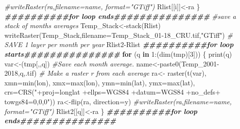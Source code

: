 \documentclass[
  10pt,
  b5paper,
]{book}
\newenvironment{Shaded}{\begin{snugshade}}{\end{snugshade}}
\newcommand{\AttributeTok}[1]{\textcolor[rgb]{0.77,0.63,0.00}{#1}}
\newcommand{\CommentTok}[1]{\textcolor[rgb]{0.56,0.35,0.01}{\textit{#1}}}
\newcommand{\ControlFlowTok}[1]{\textcolor[rgb]{0.13,0.29,0.53}{\textbf{#1}}}
\newcommand{\DecValTok}[1]{\textcolor[rgb]{0.00,0.00,0.81}{#1}}
\newcommand{\DocumentationTok}[1]{\textcolor[rgb]{0.56,0.35,0.01}{\textbf{\textit{#1}}}}
\newcommand{\FunctionTok}[1]{\textcolor[rgb]{0.00,0.00,0.00}{#1}}
\newcommand{\NormalTok}[1]{#1}
\newcommand{\OtherTok}[1]{\textcolor[rgb]{0.56,0.35,0.01}{#1}}
\newcommand{\SpecialCharTok}[1]{\textcolor[rgb]{0.00,0.00,0.00}{#1}}
\newcommand{\StringTok}[1]{\textcolor[rgb]{0.31,0.60,0.02}{#1}}
\begin{document}
\begin{Shaded}
\begin{Highlighting}[]
\CommentTok{\#writeRaster(ra,filename=name, format="GTiff")}
\NormalTok{Rlist[[i]]}\OtherTok{\textless{}{-}}\NormalTok{ra}
\NormalTok{\}}
\DocumentationTok{\#\#\#\#\#\#\#\#\#\#for loop ends\#\#\#\#\#\#\#\#\#\#\#\#\#\#\#}
 \CommentTok{\#save a stack of months averages}
\NormalTok{ Temp\_Stack}\OtherTok{\textless{}{-}}\FunctionTok{stack}\NormalTok{(Rlist)}
\FunctionTok{writeRaster}\NormalTok{(Temp\_Stack,}\AttributeTok{filename=}\StringTok{\textquotesingle{}Temp\_Stack\_01{-}18\_CRU.tif\textquotesingle{}}\NormalTok{,}\StringTok{"GTiff"}\NormalTok{)}
 \CommentTok{\# SAVE 1 layer per month per year}
\NormalTok{ Rlist2}\SpecialCharTok{{-}}\NormalTok{Rlist}
\DocumentationTok{\#\#\#\#\#\#\#\#\#\#for loop starts\#\#\#\#\#\#\#\#\#\#\#\#\#\#\#}
 \ControlFlowTok{for}\NormalTok{ (q }\ControlFlowTok{in} \DecValTok{1}\SpecialCharTok{:}\NormalTok{(}\FunctionTok{dim}\NormalTok{(tmp)[}\DecValTok{3}\NormalTok{])) \{}
\FunctionTok{print}\NormalTok{(q)}
\NormalTok{var}\OtherTok{\textless{}{-}}\NormalTok{(tmp[,,q])}
 \CommentTok{\#Save each month average. }
\NormalTok{ name}\OtherTok{\textless{}{-}}\FunctionTok{paste0}\NormalTok{(}\StringTok{\textquotesingle{}Temp\_2001{-}2018\textquotesingle{}}\NormalTok{,q,}\StringTok{\textquotesingle{}.tif\textquotesingle{}}\NormalTok{)}
 \CommentTok{\# Make a raster r from each average}
\NormalTok{ra}\OtherTok{\textless{}{-}} \FunctionTok{raster}\NormalTok{(}\FunctionTok{t}\NormalTok{(var), }\AttributeTok{xmn=}\FunctionTok{min}\NormalTok{(lon), }\AttributeTok{xmx=}\FunctionTok{max}\NormalTok{(lon), }\AttributeTok{ymn=}\FunctionTok{min}\NormalTok{(lat), }\AttributeTok{ymx=}\FunctionTok{max}\NormalTok{(lat), }\AttributeTok{crs=}\FunctionTok{CRS}\NormalTok{(}\StringTok{"+proj=longlat +ellps=WGS84 +datum=WGS84 +no\_defs+ towgs84=0,0,0"}\NormalTok{))}
\NormalTok{ra}\OtherTok{\textless{}{-}}\FunctionTok{flip}\NormalTok{(ra, }\AttributeTok{direction=}\StringTok{\textquotesingle{}y\textquotesingle{}}\NormalTok{)}
\CommentTok{\#writeRaster(ra,filename=name, format="GTiff")}
\NormalTok{Rlist2[[q]]}\OtherTok{\textless{}{-}}\NormalTok{ra}
\NormalTok{\}}
\DocumentationTok{\#\#\#\#\#\#\#\#\#\#for loop ends\#\#\#\#\#\#\#\#\#\#\#\#\#\#\#}


\end{Highlighting}
\end{Shaded}
\end{document}
